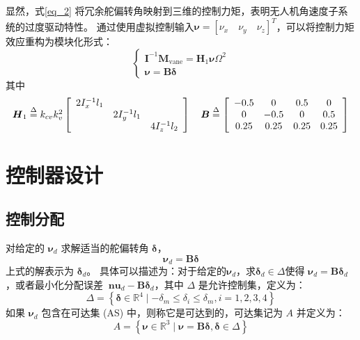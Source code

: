 显然，式\eqref{eq_2} 将冗余舵偏转角映射到三维的控制力矩，表明无人机角速度子系统的过度驱动特性。 通过使用虚拟控制输入$ \boldsymbol{\nu }=[{\nu }_{x} \quad {\nu }_{y} \quad {\nu }_{z}]^{T}$，可以将控制力矩效应重构为模块化形式：
\begin{equation}
	\left\{ \begin{array}{l}
	{{\boldsymbol{I}}^{ - 1}}{{\boldsymbol{M}}_\text{vane}} = {{\boldsymbol{H}}_1}{\boldsymbol{\nu }}{\Omega ^2}\\
	{\boldsymbol{\nu }} = {\boldsymbol{B\delta }}
	\end{array} \right.
	\label{eq_5}
	\end{equation}
其中
	\begin{equation}
	\begin{array}{ccccc}
	{{\boldsymbol{H}}_1} \buildrel \Delta \over =   {k_{cv}}k_v^2\left[ {\begin{array}{*{20}{c}}
		{2I_x^{ - 1}{l_1}}&{}&{}\\
		{}&{2I_y^{ - 1}{l_1}}&{}\\
		{}&{}&{4I_z^{ - 1}{l_2}}
		\end{array}} \right]     \quad
	{\boldsymbol{B}} \buildrel \Delta \over =   \left[ {\begin{array}{*{20}{c}}
		{ - 0.5}&0&{0.5}&0\\
		0&{ - 0.5}&0&{0.5}\\
		{0.25}&{0.25}&{0.25}&{0.25}
		\end{array}} \right]
	\end{array}
	\label{eq_6}
\end{equation}

\section{控制器设计}


\subsection{控制分配}
对给定的 ${{\boldsymbol{\nu }}_{d}}$ 求解适当的舵偏转角 $\boldsymbol{\delta }$，
\begin{equation}
	{\boldsymbol {\nu}_d}={\boldsymbol{B\delta}}
	\label{eq_29.5}
\end{equation}
上式的解表示为 $\boldsymbol{\delta }_d$。 具体可以描述为：对于给定的${{\boldsymbol{\nu }}_{d}}$，求${{\boldsymbol{\delta }}_{d}}\in \Delta $使得 ${{\boldsymbol{\nu }}_{d}}=\boldsymbol{B}{{\boldsymbol{\delta }}_{d}}$，或者最小化分配误差 ${{\boldsymbol{\ nu }}_{d}}-\boldsymbol{B}{{\boldsymbol{\delta }}_{d}}$，其中 $\Delta $ 是允许控制集，定义为：
\begin{equation}
	\Delta=\left\{\boldsymbol{\delta} \in \mathbb{R}^{4} \mid-\delta_{m} \leq \delta_{i} \leq \delta_{m}, i=1,2,3,4\right\}
	\label{eq_30}
\end{equation}
如果 ${{\boldsymbol{\nu }}_{d}}$ 包含在可达集 (AS) 中，则称它是可达到的，可达集记为 $A$ 并定义为：
\begin{equation}
	A=\left\{\boldsymbol{\nu} \in \mathbb{R}^{3} \mid \boldsymbol{\nu}=\boldsymbol{B} \boldsymbol{\delta}, \boldsymbol{\delta} \in \Delta\right\}
	\label{eq_31}
\end{equation}


